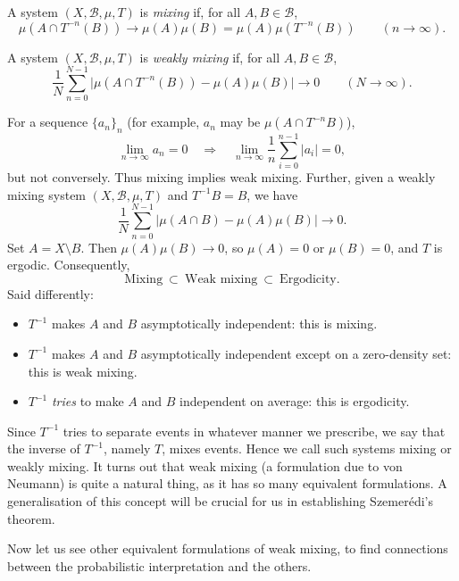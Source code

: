 \documentclass[11pt,a4paper]{article}
\begin{document}
\setcounter{definition}{5}\begin{definition}[Mixing]
A system $(X,\mathcal B,\mu,T)$ is \emph{mixing} if, for all
$A,B\in\mathcal B$,
\[
 \mu(A\cap T^{-n}(B))\longrightarrow\mu(A)\mu(B)
 =\mu(A)\mu(T^{-n}(B))\qquad(n\to\infty).
\]
\end{definition}
\setcounter{definition}{6}\begin{definition}
A system $(X,\mathcal B,\mu,T)$ is \emph{weakly mixing} if, for all
$A,B\in\mathcal B$,
\[
 \frac1N\sum_{n=0}^{N-1}
 \bigl|\mu(A\cap T^{-n}(B))-\mu(A)\mu(B)\bigr|
 \longrightarrow0\qquad(N\to\infty).
\]
\end{definition}

\begin{remark}
For a sequence $\{a_n\}_n$ (for example, $a_n$ may be
$\mu(A\cap T^{-n}B)$),
\[
 \lim_{n\to\infty}a_n=0
 \quad\Longrightarrow\quad
 \lim_{n\to\infty}\frac1n\sum_{i=0}^{n-1}|a_i|=0,
\]
but not conversely. Thus mixing implies weak mixing. Further, given a
weakly mixing system $(X,\mathcal B,\mu,T)$ and $T^{-1}B=B$, we have
\[
 \frac1N\sum_{n=0}^{N-1}|\mu(A\cap B)-\mu(A)\mu(B)|\longrightarrow0.
\]
Set $A=X\setminus B$. Then $\mu(A)\mu(B)\to0$, so $\mu(A)=0$ or
$\mu(B)=0$, and $T$ is ergodic. Consequently,
\[
 \text{Mixing}\ \subset\ \text{Weak mixing}\ \subset\ \text{Ergodicity}.
\]
Said differently:
\begin{itemize}
 \item $T^{-1}$ makes $A$ and $B$ asymptotically independent:
 this is mixing.
 \item $T^{-1}$ makes $A$ and $B$ asymptotically independent except on
 a zero-density set: this is weak mixing.
 \item $T^{-1}$ \emph{tries} to make $A$ and $B$ independent on average:
 this is ergodicity.
\end{itemize}
\end{remark}
\begin{remark}
Since $T^{-1}$ tries to separate events in whatever manner we prescribe, we
say that the inverse of $T^{-1}$, namely $T$, mixes events. Hence we call such
systems mixing or weakly mixing. It turns out that weak mixing (a formulation
due to von Neumann) is quite a natural thing, as it has so many equivalent
formulations. A generalisation of this concept will be crucial for us in
establishing Szemer\'edi's theorem.
\end{remark}
Now let us see other equivalent formulations of weak mixing, to find
connections between the probabilistic interpretation and the others.
\end{document}
